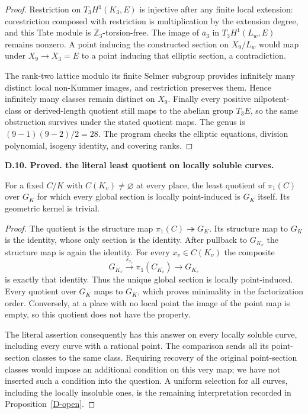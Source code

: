 \documentclass[11pt,oneside]{article}
\makeatletter
\newcounter{statementanchor}
\newenvironment{statement}[3]{%
 \refstepcounter{statementanchor}\def\@currentlabel{#1}%
 \par\addvspace{9pt}\noindent
 \textbf{#1. #2. #3.}\par\nobreak\noindent\ignorespaces
}{\par\addvspace{5pt}}
\makeatother
\begin{document}
\begin{proof}
Restriction on $T_3H^1(K_3,E)$ is
injective after any finite local
extension: corestriction composed
with restriction is multiplication
by the extension degree, and this
Tate module is $\mathbb Z_3$-torsion-free.
The image of $\overline a_3$ in
$T_3H^1(L_w,E)$ remains nonzero.
A point inducing the constructed
section on $X_9/L_w$ would map under
$X_9\to X_3=E$ to a point inducing
that elliptic section, a contradiction.

The rank-two lattice modulo its
finite Selmer subgroup provides
infinitely many distinct local
non-Kummer images, and restriction
preserves them. Hence infinitely
many classes remain distinct on
$X_9$. Finally every positive
nilpotent-class or derived-length
quotient still maps to the abelian
group $T_3E$, so the same obstruction
survives under the stated quotient
maps. The genus is
$(9-1)(9-2)/2=28$.
The program checks the elliptic
equations, division polynomial,
isogeny identity, and covering ranks.
\end{proof}





\begin{statement}{D.10}{Proved}{the literal least quotient on locally soluble curves}
\label{st:D.10}
\label{D-literal-minimum}
For a fixed $C/K$ with $C(K_v)\ne\varnothing$ at
every place, the least quotient of $\pi_1(C)$
over $G_K$ for which every global section is
locally point-induced is $G_K$ itself.
Its geometric kernel is trivial.
\end{statement}
\begin{proof}
The quotient is the structure map
$\pi_1(C)\twoheadrightarrow G_K$.
Its structure map to $G_K$ is the identity,
whose only section is the identity. After
pullback to $G_{K_v}$ the structure map is
again the identity. For every $x_v\in C(K_v)$
the composite
\[
 G_{K_v}\xrightarrow{s_{x_v}}\pi_1(C_{K_v})
 \longrightarrow G_{K_v}
\]
is exactly that identity. Thus the unique
global section is locally point-induced.
Every quotient over $G_K$ maps to $G_K$,
which proves minimality in the factorization
order. Conversely, at a place with no
local point the image of the point map
is empty, so this quotient does not have
the property.

The literal assertion consequently has
this answer on every locally soluble
curve, including every curve with a
rational point. The comparison sends
all its point-section classes to the
same class. Requiring recovery of
the original point-section classes
would impose an additional condition
on this very map; we have not inserted
such a condition into the question.
A uniform selection for all curves,
including the locally insoluble ones,
is the remaining interpretation
recorded in Proposition~\ref{D-open}.
\end{proof}
\end{document}
